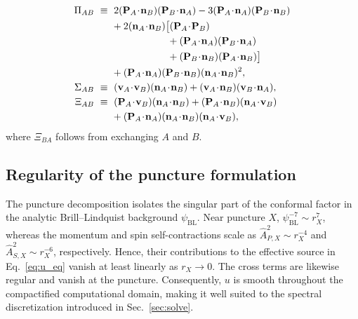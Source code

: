 \documentclass[
  aps,
  prd,
  twocolumn,
  amsmath,
  amssymb,
  nofootinbib,
  superscriptaddress,
  floatfix,
]{revtex4-2}
\newcommand{\psiBL}{\psi_{\mathrm{BL}}}
\newcommand{\Ahat}{\hat{A}}
\begin{document}
\begin{align}
  \Pi_{AB} \ &\equiv \ 2(\mathbf{P}_A\!\cdot\!\mathbf{n}_B)(\mathbf{P}_B\!\cdot\!\mathbf{n}_A)
   - 3(\mathbf{P}_A\!\cdot\!\mathbf{n}_A)(\mathbf{P}_B\!\cdot\!\mathbf{n}_B) \nonumber\\
  &\hspace{5mm} + 2(\mathbf{n}_A\!\cdot\!\mathbf{n}_B)\bigl[ (\mathbf{P}_A\!\cdot\!\mathbf{P}_B) \nonumber \\
  &\hspace{25mm} + (\mathbf{P}_A\!\cdot\!\mathbf{n}_A)(\mathbf{P}_B\!\cdot\!\mathbf{n}_A) \nonumber\\
  &\hspace{25mm} + (\mathbf{P}_B\!\cdot\!\mathbf{n}_B)(\mathbf{P}_A\!\cdot\!\mathbf{n}_B)\bigr] \nonumber\\
  &\hspace{ 5mm} + (\mathbf{P}_A\!\cdot\!\mathbf{n}_A)(\mathbf{P}_B\!\cdot\!\mathbf{n}_B)(\mathbf{n}_A\!\cdot\!\mathbf{n}_B)^2 ,
  \label{eq:invPi}\\
  \Sigma_{AB} \ &\equiv \ (\mathbf{v}_A\!\cdot\!\mathbf{v}_B)(\mathbf{n}_A\!\cdot\!\mathbf{n}_B) + (\mathbf{v}_A\!\cdot\!\mathbf{n}_B)(\mathbf{v}_B\!\cdot\!\mathbf{n}_A) ,
  \label{eq:invSigma}\\
  \Xi_{AB} \ &\equiv \ (\mathbf{P}_A\!\cdot\!\mathbf{v}_B)(\mathbf{n}_A\!\cdot\!\mathbf{n}_B)
   + (\mathbf{P}_A\!\cdot\!\mathbf{n}_B)(\mathbf{n}_A\!\cdot\!\mathbf{v}_B) \nonumber\\
  & \hspace{5mm} + (\mathbf{P}_A\!\cdot\!\mathbf{n}_A)(\mathbf{n}_A\!\cdot\!\mathbf{n}_B)(\mathbf{n}_A\!\cdot\!\mathbf{v}_B) ,
  \label{eq:invXi}
\end{align}
where $\Xi_{BA}$ follows from exchanging $A$ and $B$.


\subsection{Regularity of the puncture formulation}
\label{sec:problem:regularity}
The puncture decomposition isolates the singular part of the conformal factor in the analytic Brill--Lindquist background $\psiBL$.
Near puncture $X$, $\psiBL^{-7}\sim r_X^7$, whereas the momentum and spin self-contractions scale as $\Ahat_{P,X}^2\sim r_X^{-4}$ and $\Ahat_{S,X}^2\sim r_X^{-6}$, respectively.
Hence, their contributions to the effective source in Eq.~\eqref{eq:u_eq} vanish at least linearly as $r_X\to0$.
The cross terms are likewise regular and vanish at the puncture.
Consequently, $u$ is smooth throughout the compactified computational domain, making it well suited to the spectral discretization introduced in Sec.~\ref{sec:solve}.
\end{document}

